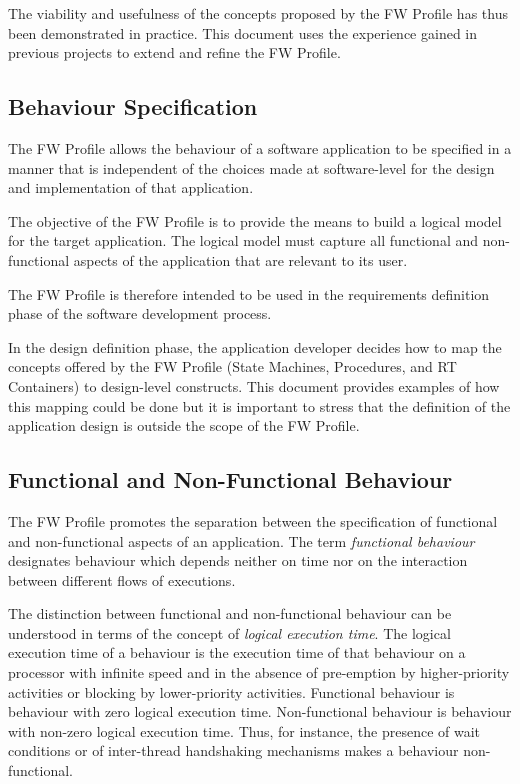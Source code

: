 \documentclass[a4paper,10pt]{article}
\begin{document}
The viability and usefulness of the concepts proposed by the FW Profile has thus been
demonstrated in practice. This document uses the experience gained in previous projects
to extend and refine the FW Profile.

\subsection{Behaviour Specification}
The FW Profile allows the behaviour of a software application to be specified in a
manner that is independent of the choices made at software-level for the design and
implementation of that application.

The objective of the FW Profile is to provide the means to build a logical model for the target
application. The logical model must capture all functional and non-functional aspects of the
application that are relevant to its user.

The FW Profile is therefore intended to be used in the requirements definition phase of the
software development process.

In the design definition phase, the application developer decides how to map the concepts
offered by the FW Profile (State Machines, Procedures, and RT Containers) to design-level
constructs. This document provides examples of how this mapping could be done but it is
important to stress that the definition of the application design is outside the scope of the FW
Profile.

\subsection{Functional and Non-Functional Behaviour}\label{sec:funcAndNonFuncBehaviour} 
The FW Profile promotes the separation between the specification of functional and non-functional aspects of an application. The term \textit{functional behaviour} designates behaviour which depends neither on time nor on the interaction between different flows of executions.

The distinction between functional and non-functional behaviour can be understood in terms of the concept of \textit{logical execution time}. The logical execution time of a behaviour is the execution time of that behaviour on a processor with infinite speed and in the absence of pre-emption by higher-priority activities or blocking by lower-priority activities. Functional behaviour is behaviour with zero logical execution time. Non-functional behaviour is behaviour with non-zero logical execution time. Thus, for instance, the presence of wait conditions or of inter-thread handshaking mechanisms makes a behaviour non-functional.  
\end{document}
